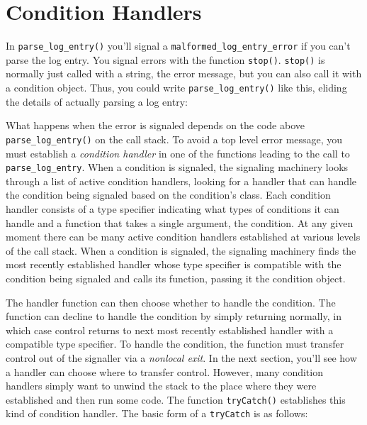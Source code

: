 \hypertarget{condition-handlers}{%
\section{Condition Handlers}\label{condition-handlers}}

In \texttt{parse\_log\_entry()} you'll signal a
\texttt{malformed\_log\_entry\_error} if you can't parse the log entry.
You signal errors with the function \texttt{stop()}. \texttt{stop()} is
normally just called with a string, the error message, but you can also
call it with a condition object. Thus, you could write
\texttt{parse\_log\_entry()} like this, eliding the details of actually
parsing a log entry:

\begin{Shaded}
\begin{Highlighting}[]
\StringTok{ }
  \NormalTok{ (}\OperatorTok{!}
    \NormalTok{(}
\NormalTok{  \}}
  
\NormalTok{\}}
\end{Highlighting}
\end{Shaded}

What happens when the error is signaled depends on the code above
\texttt{parse\_log\_entry()} on the call stack. To avoid a top level
error message, you must establish a \emph{condition handler} in one of
the functions leading to the call to \texttt{parse\_log\_entry}. When a
condition is signaled, the signaling machinery looks through a list of
active condition handlers, looking for a handler that can handle the
condition being signaled based on the condition's class. Each condition
handler consists of a type specifier indicating what types of conditions
it can handle and a function that takes a single argument, the
condition. At any given moment there can be many active condition
handlers established at various levels of the call stack. When a
condition is signaled, the signaling machinery finds the most recently
established handler whose type specifier is compatible with the
condition being signaled and calls its function, passing it the
condition object.

The handler function can then choose whether to handle the condition.
The function can decline to handle the condition by simply returning
normally, in which case control returns to next most recently
established handler with a compatible type specifier. To handle the
condition, the function must transfer control out of the signaller via a
\emph{nonlocal exit}. In the next section, you'll see how a handler can
choose where to transfer control. However, many condition handlers
simply want to unwind the stack to the place where they were established
and then run some code. The function \texttt{tryCatch()} establishes
this kind of condition handler. The basic form of a \texttt{tryCatch} is
as follows:

